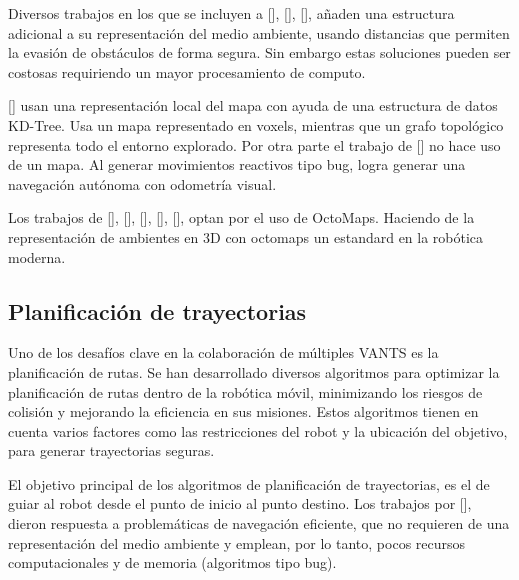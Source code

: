 Diversos trabajos en los que se incluyen a \citeauthor{GAO2018}[], \citeauthor{LIN2017}[], \cite{OLEYNIKOVA2018}[], añaden una estructura adicional a su representación del medio ambiente, usando distancias que permiten la evasión de obstáculos de forma segura. Sin embargo estas soluciones pueden ser costosas requiriendo un mayor procesamiento de computo.

\citeauthor{COLLINS2019}[] usan una representaci\'{o}n local del mapa con ayuda de una estructura de datos KD-Tree. Usa un mapa representado en voxels, mientras que un grafo topol\'{o}gico representa todo el entorno explorado. Por otra parte el trabajo de \citeauthor{BUG2019}[] no hace uso de un mapa. Al generar movimientos reactivos tipo bug, logra generar una navegación autónoma con odometría visual.

Los trabajos de \citeauthor{PAPACHRISTOS2017}[], \citeauthor{SELIN2019}[], \citeauthor{CINVES2021}[], \citeauthor{RACER2022}[], \citeauthor{BARTOLOMEI2023}[], optan por el uso de OctoMaps. Haciendo de la representación de ambientes en 3D con octomaps un estandard en la robótica moderna.

\subsection{Planificación de trayectorias}

Uno de los desaf\'{i}os clave en la colaboraci\'{o}n de m\'{u}ltiples VANTS es la planificaci\'{o}n de rutas. Se han desarrollado diversos algoritmos para optimizar la planificaci\'{o}n de rutas dentro de la rob\'{o}tica m\'{o}vil, minimizando los riesgos de colisi\'{o}n y mejorando la eficiencia en sus misiones. Estos algoritmos tienen en cuenta varios factores como las restricciones del robot y la ubicación del objetivo, para generar trayectorias seguras.

El objetivo principal de los algoritmos de planificación de trayectorias, es el de guiar al robot desde el punto de inicio al punto destino. Los trabajos por \citeauthor{Lumelsky1987}[], dieron respuesta a problemáticas de navegaci\'{o}n eficiente, que no requieren de una representación del medio ambiente y emplean, por lo tanto, pocos recursos computacionales y de memoria (algoritmos tipo bug).


